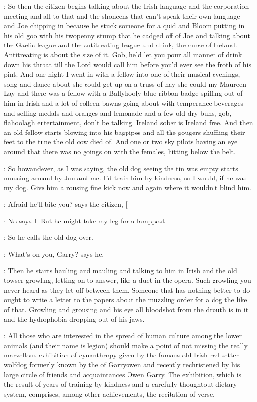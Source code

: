 \Nq:
So then the citizen begins talking about the Irish language and the
corporation meeting
and all to that and the shoneens that can't speak
their own language and Joe chipping in because he stuck someone for
a quid and Bloom putting in his old goo with his twopenny stump that
he cadged off of Joe and talking about the Gaelic league and the
antitreating league and drink,
the curse of Ireland.
Antitreating
is about the size of it.
Gob,
he'd let you pour all manner of drink
down his throat till the Lord would call him before you'd ever
see the froth of his pint.
And one night I went in with a fellow
into one of their musical evenings,
song and dance about she could
get up on a truss of hay she could my Maureen Lay and there was a fellow
with a Ballyhooly blue ribbon badge spiffing out of him in Irish and a lot
of colleen bawns going about with temperance beverages
and selling medals
and oranges and lemonade and a few old dry buns,
gob,
flahoolagh
entertainment,
don't be talking.
Ireland sober is Ireland free.
And then
an old fellow starts blowing into his bagpipes and all the gougers
shuffling their feet to the tune the old cow died of.
And one or two sky
pilots having an eye around that there was no goings on with the females,
hitting below the belt.

\Nq:
So howandever,
as I was saying,
the old dog seeing the tin was empty
starts mousing around by Joe and me.
I'd train him by kindness,
so I
would,
if he was my dog.
Give him a rousing fine kick now and again where
it wouldn't blind him.%

\citizen:
Afraid he'll bite you?
\sout{says the citizen,} []

:
No
\sout{says I.}
But he might take my leg for a lamppost.

\Nq:
So he calls the old dog over.

\citizen:
What's on you,
Garry?
\sout{says he.}

\Nq:
Then he starts hauling and mauling and talking to him in Irish and
the old towser growling,
letting on to answer,
like a duet in the opera.
Such growling you never heard as they let off between them.
Someone that
has nothing better to do ought to write a letter  to the
papers about the muzzling order for a dog the like of that.
Growling and
grousing and his eye all bloodshot from the drouth is in it
and the
hydrophobia dropping out of his jaws.

:
All those who are interested in the spread of human culture among
the lower animals (and their name is legion) should make a point of not
missing the really marvellous exhibition of cynanthropy given by the
famous old Irish red setter wolfdog formerly known by the  of
Garryowen and recently rechristened by his large circle of friends and
acquaintances Owen Garry.
The exhibition,
which is the result of years of
training by kindness and a carefully thoughtout dietary system,
comprises,
among other achievements,
the recitation of verse.

